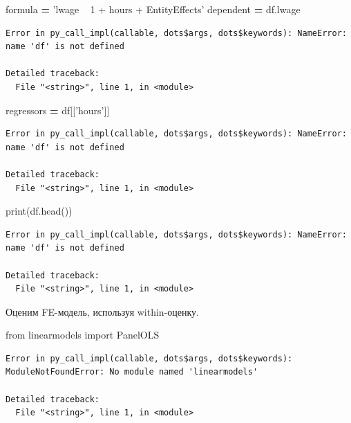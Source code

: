 \documentclass[]{book}
\newenvironment{Shaded}{\begin{snugshade}}{\end{snugshade}}
\newcommand{\BuiltInTok}[1]{#1}
\newcommand{\ImportTok}[1]{#1}
\newcommand{\NormalTok}[1]{#1}
\newcommand{\OperatorTok}[1]{\textcolor[rgb]{0.81,0.36,0.00}{\textbf{#1}}}
\newcommand{\StringTok}[1]{\textcolor[rgb]{0.31,0.60,0.02}{#1}}
\begin{document}
\begin{Shaded}
\begin{Highlighting}[]
\NormalTok{formula }\OperatorTok{=} \StringTok{'lwage ~ 1 + hours + EntityEffects'}
\NormalTok{dependent }\OperatorTok{=}\NormalTok{ df.lwage}
\end{Highlighting}
\end{Shaded}

\begin{verbatim}
Error in py_call_impl(callable, dots$args, dots$keywords): NameError: name 'df' is not defined

Detailed traceback: 
  File "<string>", line 1, in <module>
\end{verbatim}

\begin{Shaded}
\begin{Highlighting}[]
\NormalTok{regressors }\OperatorTok{=}\NormalTok{ df[[}\StringTok{'hours'}\NormalTok{]]}
\end{Highlighting}
\end{Shaded}

\begin{verbatim}
Error in py_call_impl(callable, dots$args, dots$keywords): NameError: name 'df' is not defined

Detailed traceback: 
  File "<string>", line 1, in <module>
\end{verbatim}

\begin{Shaded}
\begin{Highlighting}[]
\BuiltInTok{print}\NormalTok{(df.head())}
\end{Highlighting}
\end{Shaded}

\begin{verbatim}
Error in py_call_impl(callable, dots$args, dots$keywords): NameError: name 'df' is not defined

Detailed traceback: 
  File "<string>", line 1, in <module>
\end{verbatim}

Оценим FE-модель, используя within-оценку.

\begin{Shaded}
\begin{Highlighting}[]
\ImportTok{from}\NormalTok{ linearmodels }\ImportTok{import}\NormalTok{ PanelOLS}
\end{Highlighting}
\end{Shaded}

\begin{verbatim}
Error in py_call_impl(callable, dots$args, dots$keywords): ModuleNotFoundError: No module named 'linearmodels'

Detailed traceback: 
  File "<string>", line 1, in <module>
\end{verbatim}
\end{document}
